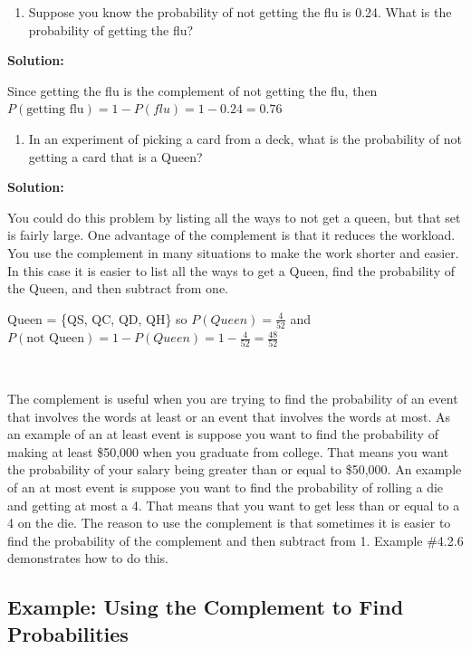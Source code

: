 \documentclass[]{book}
\providecommand{\tightlist}{%
  \setlength{\itemsep}{0pt}\setlength{\parskip}{0pt}}
\begin{document}
\begin{enumerate}
\def\labelenumi{\alph{enumi}.}
\setcounter{enumi}{1}
\tightlist
\item
  Suppose you know the probability of not getting the flu is 0.24.
  What is the probability of getting the flu?
\end{enumerate}

\textbf{Solution:}

Since getting the flu is the complement of not getting the flu, then \(P(\text{getting flu})=1-P(flu)=1-0.24=0.76\)

\begin{enumerate}
\def\labelenumi{\alph{enumi}.}
\setcounter{enumi}{2}
\tightlist
\item
  In an experiment of picking a card from a deck, what is the probability of not getting a card that is a Queen?
\end{enumerate}

\textbf{Solution:}

You could do this problem by listing all the ways to not get a queen, but that set is fairly large. One advantage of the complement is that it reduces the workload. You use the complement in many situations to make the work shorter and easier. In this case it is easier to list all the ways to get a Queen, find the probability of the Queen, and then subtract from one.

Queen = \{QS, QC, QD, QH\} so \(P(Queen)=\frac{4}{52}\) and \(P(\text{not Queen})=1-P(Queen)=1-\frac{4}{52}=\frac{48}{52}\)

\textbf{\\
}

The complement is useful when you are trying to find the probability of
an event that involves the words at least or an event that involves the
words at most. As an example of an at least event is suppose you want to
find the probability of making at least \$50,000 when you graduate from
college. That means you want the probability of your salary being
greater than or equal to \$50,000. An example of an at most event is
suppose you want to find the probability of rolling a die and getting at
most a 4. That means that you want to get less than or equal to a 4 on
the die. The reason to use the complement is that sometimes it is easier
to find the probability of the complement and then subtract from 1.
Example \#4.2.6 demonstrates how to do this.

\hypertarget{example-using-the-complement-to-find-probabilities}{%
\subsection{Example: Using the Complement to Find Probabilities}\label{example-using-the-complement-to-find-probabilities}}
\end{document}

